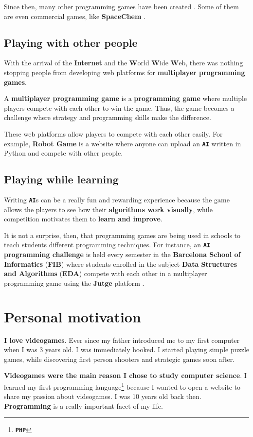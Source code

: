\documentclass[a4paper,11pt,titlepage,abstract,numbers=noenddot,automark,mnsy,intlimits,rgb,dvipsnames]{report}
\begin{document}
Since then, many other programming games have been created \cite{pg}. Some of them are even commercial games, like
\textbf{SpaceChem} \cite{spacechem}.
\subsection{Playing with other people}
With the arrival of the \textbf{Internet} and the \textbf{W}orld \textbf{W}ide \textbf{W}eb, there was nothing stopping people from
developing web platforms for \textbf{multiplayer programming games}.

A \textbf{multiplayer programming game} is a \textbf{programming game} where multiple players compete with each other to win the
game. Thus, the game becomes a challenge where strategy and programming skills make the difference.

These web platforms allow players to compete with each other easily. For example, \textbf{Robot Game}
\cite{robotgame} is a website where anyone can upload an \textbf{\texttt{AI}} written in \texttt{}Python\texttt{} and compete with other people.
\subsection{Playing while learning}
Writing \textbf{\texttt{AI}}s can be a really fun and rewarding experience because the game allows the players to see how their
\textbf{algorithms work visually}, while competition motivates them to \textbf{learn and improve}.

It is not a surprise, then, that programming games are being used in schools to teach students different programming
techniques. For instance, an \textbf{\texttt{AI} programming challenge} is held every semester in the \textbf{Barcelona School of
Informatics} (\textbf{FIB}) where students enrolled in the subject \textbf{Data Structures and Algorithms} (\textbf{EDA}) \cite{eda}
compete with each other in a multiplayer programming game using the \textbf{Jutge} platform \cite{jutge}.
\section{Personal motivation}
\textbf{I love videogames}. Ever since my father introduced me to my first computer when I was 3 years old.
I was immediately hooked. I started playing simple puzzle games, while discovering first person shooters and strategic
games soon after.

\textbf{Videogames were the main reason I chose to study computer science}. I learned my first
programming language\footnote{\textbf{\texttt{PHP}}} because I wanted to open a website
to share my passion about videogames. I was 10 years old back then. \textbf{Programming} is a really important
facet of my life.
\end{document}
